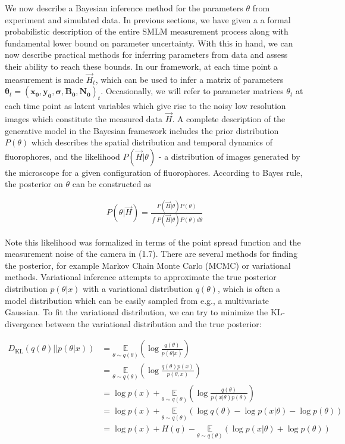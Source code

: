 \documentclass{ucetd}
\begin{document}
We now describe a Bayesian inference method for the parameters $\theta$ from experiment and simulated data. In previous sections, we have given a a formal probabilistic description of the entire SMLM measurement process along with fundamental lower bound on parameter uncertainty. With this in hand, we can now describe practical methods for inferring parameters from data and assess their ability to reach these bounds.  In our framework, at each time point a measurement is made $\vec{H}_{t}$, which can be used to infer a matrix of parameters $\bm{\theta}_{t} = (\bm{x_{0}},\bm{y_{0}},\bm{\sigma},\bm{B_{0}},\bm{N_{0}})_{t}$. Occasionally, we will refer to parameter matrices $\theta_{t}$ at each time point as latent variables which give rise to the noisy low resolution images which constitute the measured data $\vec{H}$. A complete description of the generative model in the Bayesian framework includes the prior distribution $P(\theta)$ which describes the spatial distribution and temporal dynamics of fluorophores, and the likelihood $P(\vec{H}|\theta)$ - a distribution of images generated by the microscope for a given configuration of fluorophores. According to Bayes rule, the posterior on $\theta$ can be constructed as

\begin{align}
P(\theta|\vec{H}) = \frac{P(\vec{H}|\theta)P(\theta)}{\int P(\vec{H}|\theta)P(\theta) d\theta}
\end{align}

Note this likelihood was formalized in terms of the point spread function and the measurement noise of the camera in (1.7). There are several methods for finding the posterior, for example Markov Chain Monte Carlo (MCMC) or variational methods. Variational inference attempts to approximate the true posterior distribution $p(\theta|x)$ with a variational distribution $q(\theta)$, which is often a model distribution which can be easily sampled from e.g., a multivariate Gaussian. To fit the variational distribution, we can try to minimize the KL-divergence between the variational distribution and the true posterior:

\begin{align*}
D_{\mathrm{KL}}(q(\theta)||p(\theta|x)) &= \underset{{\theta \sim q(\theta)}}{\mathbb{E}}\left(\log\frac{q(\theta)}{p(\theta|x)}\right)\\
&=  \underset{{\theta \sim q(\theta)}}{\mathbb{E}}\left(\log\frac{q(\theta)p(x)}{p(\theta,x)}\right)\\
&=  \log p(x) + \underset{{\theta \sim q(\theta)}}{\mathbb{E}}\left(\log\frac{q(\theta)}{p(x|\theta)p(\theta)}\right)\\
&= \log p(x) + \underset{{\theta \sim q(\theta)}}{\mathbb{E}}\left(\log q(\theta) - \log p(x|\theta) - \log p(\theta) \right)\\
&= \log p(x) + H(q) -\underset{{\theta \sim q(\theta)}}{\mathbb{E}}\left(\log p(x|\theta) + \log p(\theta) \right)
\end{align*}
\end{document}
